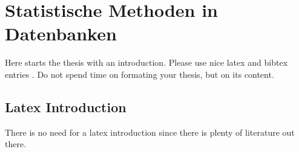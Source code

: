 \chapter{Statistische Methoden in Datenbanken}

Here starts the thesis with an introduction. Please use nice latex and bibtex entries \cite{latex}. Do not spend time on formating your thesis, but on its content.

\section{Latex Introduction}
There is no need for a latex introduction since there is plenty of literature out there.
